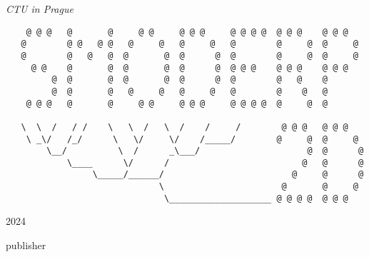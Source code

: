 \begin{titlepage}
	\vspace{0.5\baselineskip} %
	
	\textit{CTU in Prague} %
	
	\vfill %
	
	
	
	
	\begin{verbatim}
    @ @ @   @       @     @ @     @ @ @     @ @ @ @  @ @ @    @ @ @
   @        @ @   @ @   @     @   @     @   @        @     @  @     @
   @        @   @   @  @       @  @      @  @        @     @  @     @
     @ @    @       @  @       @  @      @  @ @ @    @ @ @    @ @ @
         @  @       @  @       @  @      @  @        @   @    @
         @  @       @   @     @   @     @   @        @    @   @
    @ @ @   @       @     @ @     @ @ @     @ @ @ @  @     @  @

   \  \  /   / /    \   \  /   \  /    /     /        @ @ @   @ @ @
    \ _\/   /_/      \   \/     \/    /_____/        @     @  @     @
        \__/          \  /      _\___/                     @  @      @
            \____      \/      /                          @   @      @
                 \_____/______/                         @     @      @
                              \                       @       @     @
                               \____________________ @ @ @ @  @ @ @
 \end{verbatim}
 
 
 
        
	
	\vspace{0.3\baselineskip} %
	
	2024 %
	
	{\large publisher} %

\end{titlepage}



